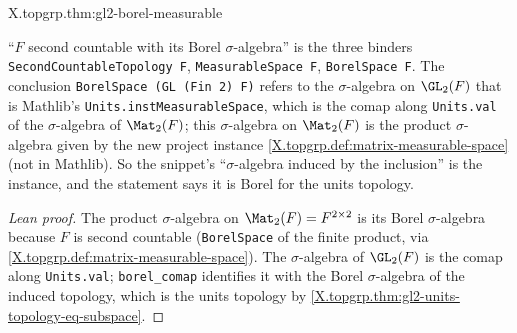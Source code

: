 \begin{theorem}
\end{theorem}
\begin{tfformal}{X.topgrp.thm:gl2-borel-measurable}
\begin{tffidelity}
``$F$ second countable with its Borel $\sigma$-algebra'' is the three binders \texttt{SecondCountableTopology F}, \texttt{MeasurableSpace F}, \texttt{BorelSpace F}. The conclusion \texttt{BorelSpace (GL (Fin 2) F)} refers to the $\sigma$-algebra on $\GL_2(F)$ that is Mathlib's \texttt{Units.instMeasurableSpace}, which is the comap along \texttt{Units.val} of the $\sigma$-algebra of $\Mat_2(F)$; this $\sigma$-algebra on $\Mat_2(F)$ is the product $\sigma$-algebra given by the new project instance \cref{X.topgrp.def:matrix-measurable-space} (not in Mathlib). So the snippet's ``$\sigma$-algebra induced by the inclusion'' is the instance, and the statement says it is Borel for the units topology.
\end{tffidelity}
\end{tfformal}
\begin{proof}[Lean proof]
The product $\sigma$-algebra on $\Mat_2(F)=F^{2\times2}$ is its Borel $\sigma$-algebra because $F$ is second countable (\texttt{BorelSpace} of the finite product, via \cref{X.topgrp.def:matrix-measurable-space}). The $\sigma$-algebra of $\GL_2(F)$ is the comap along \texttt{Units.val}; \texttt{borel\_comap} identifies it with the Borel $\sigma$-algebra of the induced topology, which is the units topology by \cref{X.topgrp.thm:gl2-units-topology-eq-subspace}.
\end{proof}

